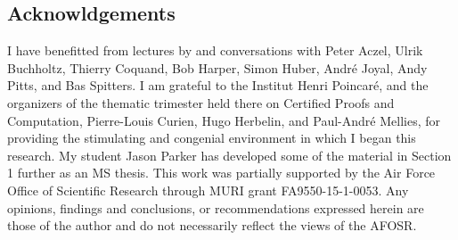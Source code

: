\documentclass[11pt]{article}
\newcommand{\C}{\ensuremath{\mathbb{C}}}
\newcommand{\psh}[1]{\ensuremath{\mathsf{Set}^{#1^{\mathrm{op}}}}}
\theoremstyle{remark}
\theoremstyle{definition}
\begin{document}
%
%
%

\subsection*{Acknowldgements}
I have benefitted from lectures by and conversations with Peter Aczel, Ulrik Buchholtz, Thierry Coquand, Bob Harper, Simon Huber, Andr\'e Joyal, Andy Pitts, and Bas Spitters.  I am grateful to the Institut Henri Poincar\'e, and the organizers of the thematic trimester held there on Certified Proofs and Computation, Pierre-Louis Curien, Hugo Herbelin, and Paul-Andr\'e Mellies, for providing the stimulating and congenial environment in which I began this research.  My student Jason Parker has developed some of the material in Section 1 further as an MS thesis.  This work was partially supported by the Air Force Office of Scientific Research through MURI grant FA9550-15-1-0053.  Any opinions, findings and conclusions, or recommendations expressed herein are those of the author and do not necessarily reflect the views of the AFOSR.  
\end{document}
